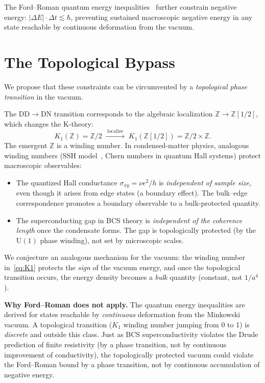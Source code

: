 \documentclass[aps,prl,twocolumn,superscriptaddress,nofootinbib]{revtex4-2}
\begin{document}
The Ford--Roman quantum energy
inequalities~\cite{Ford1995,Ford1997} further constrain negative
energy: $|\Delta E|\cdot\Delta t\lesssim\hbar$, preventing
sustained macroscopic negative energy in any state reachable by
continuous deformation from the vacuum.

\section{The Topological Bypass}

We propose that these constraints can be circumvented by a
\emph{topological phase transition} in the vacuum.

The DD$\to$DN transition corresponds to the algebraic localization
$\mathbb{Z}\to\mathbb{Z}[1/2]$, which changes the K-theory:
\begin{equation}\label{eq:K1}
  K_1(\mathbb{Z})=\mathbb{Z}/2
  \;\xrightarrow{\;\text{localize}\;}\;
  K_1(\mathbb{Z}[1/2])=\mathbb{Z}/2\times\mathbb{Z}.
\end{equation}
The emergent $\mathbb{Z}$ is a winding number.  In condensed-matter
physics, analogous winding numbers (SSH model~\cite{SSH1979},
Chern numbers in quantum Hall systems) protect macroscopic
observables:
\begin{itemize}
\item The quantized Hall conductance $\sigma_{xy}=\nu e^2/h$ is
\emph{independent of sample size}, even though it arises from
edge states (a boundary effect).  The bulk--edge correspondence
promotes a boundary observable to a bulk-protected quantity.
\item The superconducting gap in BCS theory is \emph{independent
of the coherence length} once the condensate forms.  The gap is
topologically protected (by the $\mathrm{U}(1)$ phase winding),
not set by microscopic scales.
\end{itemize}

We conjecture an analogous mechanism for the vacuum: the winding
number in~\eqref{eq:K1} protects the \emph{sign} of the vacuum
energy, and once the topological transition occurs, the energy
density becomes a \emph{bulk} quantity (constant, not $1/a^4$).

\medskip
\noindent\textbf{Why Ford--Roman does not apply.}  The quantum
energy inequalities are derived for states reachable by
\emph{continuous} deformation from the Minkowski vacuum.  A
topological transition ($K_1$ winding number jumping from 0 to 1)
is \emph{discrete} and outside this class.  Just as BCS
superconductivity violates the Drude prediction of finite
resistivity (by a phase transition, not by continuous improvement
of conductivity), the topologically protected vacuum could violate
the Ford--Roman bound by a phase transition, not by continuous
accumulation of negative energy.
\end{document}
